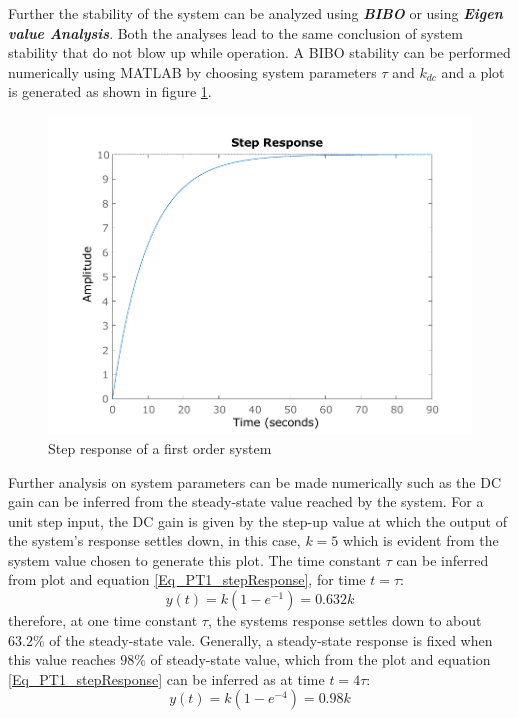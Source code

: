 Further the stability of the system can be analyzed using \textbf{\textit{BIBO}} or using \textbf{\textit{Eigen value Analysis}}. Both the analyses lead to the same conclusion of system stability that do not blow up while operation. A BIBO stability can be performed numerically using MATLAB by choosing system parameters $\tau$ and $k_{dc}$ and a plot is generated as shown in figure \ref{fig:StepResponseFirstOrder}.
\begin{figure}[h!]
	\centering
	\includegraphics[scale=0.6]{Bilder/firstOrderSystemStepResponse.pdf}
	\caption{Step response of a first order system}
	\label{fig:StepResponseFirstOrder}
\end{figure}
Further analysis on system parameters can be made numerically such as the DC gain can be inferred from the steady-state value reached by the system. For a unit step input, the DC gain is given by the step-up value at which the output of the system's response settles down, in this case, $k = 5$ which is evident from the system value chosen to generate this plot. The time constant $\tau$ can be inferred from plot and equation \eqref{Eq_PT1_stepResponse}, for time $t = \tau$:
\begin{equation}
y(t) = k(1 - e^{-1}) = 0.632 k
\end{equation}
therefore, at one time constant $\tau$, the systems response settles down to about $63.2\%$ of the steady-state vale. Generally, a steady-state response is fixed when this value reaches $98\%$ of steady-state value, which from the plot and equation \eqref{Eq_PT1_stepResponse} can be inferred as at time $t = 4 \tau$:
\begin{equation}
y(t) = k(1 - e^{-4}) = 0.98 k
\end{equation}


